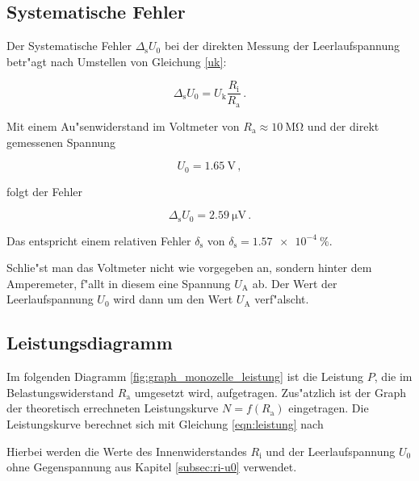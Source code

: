 	\subsection{Systematische Fehler}
	\label{subsec:fehler}
		Der Systematische Fehler $\Delta_\mathrm{s} U_0$ bei der direkten Messung der Leerlaufspannung betr"agt nach Umstellen von Gleichung \eqref{uk}:

		\begin{equation*}
			\Delta_\mathrm{s} U_0 = U_\mathrm{k} \frac{R_\mathrm{i}}{R_\mathrm{a}} \,.
		\end{equation*}

		Mit einem Au"senwiderstand im Voltmeter von $R_\mathrm{a} \approx \SI{10}{\mega \ohm}$ und der direkt gemessenen Spannung

		\begin{equation*}
			U_0 = \SI{1.65}{\volt} \,,
		\end{equation*}
		
		folgt der Fehler

		\begin{equation*}
			\Delta_\mathrm{s} U_0 = \SI{2.59}{\micro \volt} \,.
		\end{equation*}

		Das entspricht einem relativen Fehler $\delta_\mathrm{s}$ von $\delta_\mathrm{s} = \SI{1.57e-4}{\percent}$.

		Schlie"st man das Voltmeter nicht wie vorgegeben an, sondern hinter dem Amperemeter, f"allt in diesem eine Spannung $U_\mathrm{A}$ ab.
		Der Wert der Leerlaufspannung $U_0$ wird dann um den Wert $U_\mathrm{A}$ verf"alscht.

	\subsection{Leistungsdiagramm}
	\label{subsec:leistung}
		Im folgenden Diagramm \ref{fig:graph_monozelle_leistung} ist die Leistung $P$, die im Belastungswiderstand $R_\mathrm{a}$ umgesetzt wird, aufgetragen.
		Zus"atzlich ist der Graph der theoretisch errechneten Leistungskurve $N = f(R_\mathrm{a})$ eingetragen.
		Die Leistungskurve berechnet sich mit Gleichung \eqref{eqn:leistung} nach


		Hierbei werden die Werte des Innenwiderstandes $R_\mathrm{i}$ und der Leerlaufspannung $U_0$ ohne Gegenspannung aus Kapitel \ref{subsec:ri-u0} verwendet.

